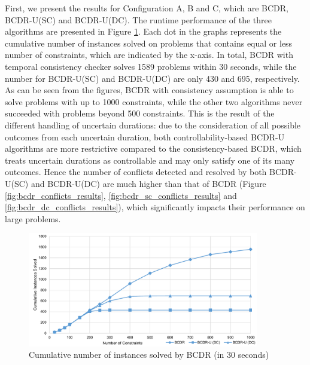 \documentclass[jair,twoside,11pt,theapa]{article}
\begin{document}
First, we present the results for Configuration A, B and C, which are BCDR,
BCDR-U(SC) and BCDR-U(DC). The runtime performance of the three algorithms are
presented in Figure \ref{fig:bcdr_runtime_results}. Each dot in the graphs
represents the cumulative number of instances solved on problems that contains
equal or less number of constraints, which are indicated by the x-axis. In
total, BCDR with temporal consistency checker solves 1589 problems within 30
seconds, while the number for BCDR-U(SC) and BCDR-U(DC) are only 430 and 695,
respectively. As can be seen from the figures, BCDR with consistency assumption
is able to solve problems with up to 1000 constraints, while the other two
algorithms never succeeded with problems beyond 500 constraints. This is the
result of the different handling of uncertain durations: due to the
consideration of all possible outcomes from each uncertain duration, both
controllability-based BCDR-U algorithms are more restrictive compared to the
consistency-based BCDR, which treats uncertain durations as controllable and may
only satisfy one of its many outcomes. Hence the number of conflicts detected
and resolved by both BCDR-U(SC) and BCDR-U(DC) are much higher than that of BCDR
(Figure \ref{fig:bcdr_conflicts_results}, \ref{fig:bcdr_sc_conflicts_results}
and \ref{fig:bcdr_dc_conflicts_results}), which significantly impacts their
performance on large problems.


\begin{figure}[!ht]
	\centering
	\includegraphics[width=0.9\textwidth]{figures/results/bcdr_runtime.pdf}
	\caption{Cumulative number of instances solved by BCDR (in 30 seconds)}
	\label{fig:bcdr_runtime_results}
\end{figure}


%
%
\end{document}
